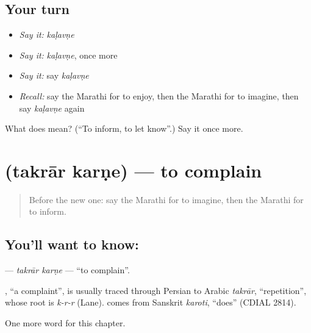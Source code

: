 \subsection*{Your turn}
\begin{itemize}
\raggedright
  \item \emph{Say it:} \emph{kaḷavṇe}
  \item \emph{Say it:} \emph{kaḷavṇe}, once more
  \item \emph{Say it:} say \emph{kaḷavṇe}
  \item \emph{Recall:} say the Marathi for to enjoy, then the Marathi for to imagine, then say \emph{kaḷavṇe} again
\end{itemize}

\begin{tcolorbox}[breakable,colback=teal!4,colframe=teal!35!black,title={Before you move on}]
What does  mean? (\textquotedblleft{}To inform, to let know\textquotedblright{}.) Say it once more.
\end{tcolorbox}
\section[\texorpdfstring{\mr{तक्रार} \mr{करणे} (takrār karṇe)}{तक्रार करणे (takrār karṇe)}]{  (takrār karṇe) — to complain}

\label{lesson:MR-C253-takrar-karne}



\begin{quote}
Before the new one: say the Marathi for to imagine, then the Marathi for to inform.
\end{quote}

\subsection*{You'll want to know:  }
\textbf{ } — \emph{takrār karṇe} — \textquotedblleft{}to complain\textquotedblright{}.

\begin{cousinweb}
\textbf{}, \textquotedblleft{}a complaint\textquotedblright{}, is usually traced through Persian to Arabic \emph{takrār}, \textquotedblleft{}repetition\textquotedblright{}, whose root is \emph{k-r-r} (Lane). \textbf{} comes from Sanskrit \emph{karoti}, \textquotedblleft{}does\textquotedblright{} (CDIAL 2814).
\end{cousinweb}

\begin{grammarlens}[title={What you've built}]
One more word for this chapter.
\end{grammarlens}

